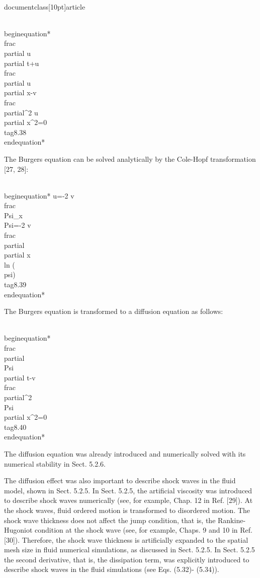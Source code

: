 \\documentclass[10pt]{article}
\begin{document}
{{{{{\\begin{equation*}
\\frac{\\partial u}{\\partial t}+u \\frac{\\partial u}{\\partial x}-v \\frac{\\partial^{2} u}{\\partial x^{2}}=0 \\tag{8.38}
\\end{equation*}


The Burgers equation can be solved analytically by the Cole-Hopf transformation [27, 28]:


\\begin{equation*}
u=-2 v \\frac{\\Psi_{x}}{\\Psi}=-2 v \\frac{\\partial}{\\partial x} \\ln (\\psi) \\tag{8.39}
\\end{equation*}


The Burgers equation is transformed to a diffusion equation as follows:


\\begin{equation*}
\\frac{\\partial \\Psi}{\\partial t}-v \\frac{\\partial^{2} \\Psi}{\\partial x^{2}}=0 \\tag{8.40}
\\end{equation*}


The diffusion equation was already introduced and numerically solved with its numerical stability in Sect. 5.2.6.

The diffusion effect was also important to describe shock waves in the fluid model, shown in Sect. 5.2.5. In Sect. 5.2.5, the artificial viscosity was introduced to describe shock waves numerically (see, for example, Chap. 12 in Ref. [29]). At the shock waves, fluid ordered motion is transformed to disordered motion. The shock wave thickness does not affect the jump condition, that is, the Rankine-Hugoniot condition at the shock wave (see, for example, Chaps. 9 and 10 in Ref. [30]). Therefore, the shock wave thickness is artificially expanded to the spatial mesh size in fluid numerical simulations, as discussed in Sect. 5.2.5. In Sect. 5.2.5 the second derivative, that is, the dissipation term, was explicitly introduced to describe shock waves in the fluid simulations (see Eqs. (5.32)- (5.34)).

}}}}}
\end{document}
